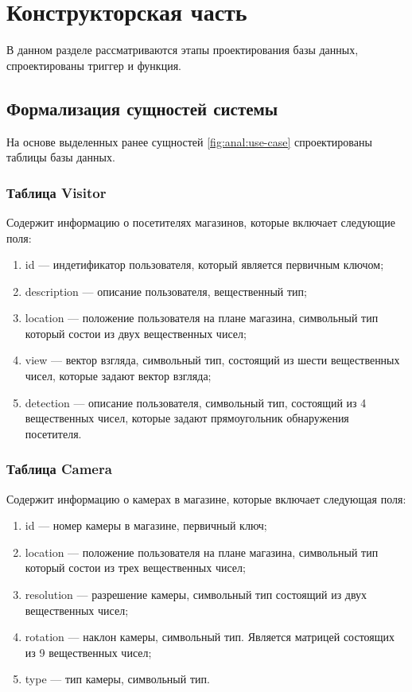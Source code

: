 \section{Конструкторская часть}

В данном разделе рассматриваются этапы проектирования базы данных, спроектированы триггер и функция.

\subsection{Формализация сущностей системы}

На основе выделенных ранее сущностей \ref{fig:anal:use-case} спроектированы таблицы 
базы данных.

\subsubsection{Таблица Visitor}

Содержит информацию о посетителях магазинов, которые включает следующие поля:

\begin{enumerate}[label=\arabic*.]
    \item id --- индетификатор пользователя, который является первичным ключом;
    \item description --- описание пользователя, вещественный тип;
    \item location --- положение пользователя на плане магазина, символьный тип 
    который состои из двух вещественных чисел;
    \item view --- вектор взгляда, символьный тип, состоящий из шести вещественных
    чисел, которые задают вектор взгляда;
    \item detection --- описание пользователя, символьный тип, 
    состоящий из 4 вещественных
    чисел, которые задают прямоугольник обнаружения посетителя.
\end{enumerate}

\subsubsection{Таблица Camera}

Содержит информацию о камерах в магазине, которые включает следующая поля:

\begin{enumerate}[label=\arabic*.]
    \item id --- номер камеры в магазине, первичный ключ;
    \item location --- положение пользователя на плане магазина, символьный тип 
    который состои из трех вещественных чисел;
    \item resolution --- разрешение камеры, символьный тип состоящий из двух
    вещественных чисел;
    \item rotation --- наклон камеры, символьный тип. Является матрицей
    состоящих из 9 вещественных чисел;
    \item type --- тип камеры, символьный тип.
\end{enumerate}


